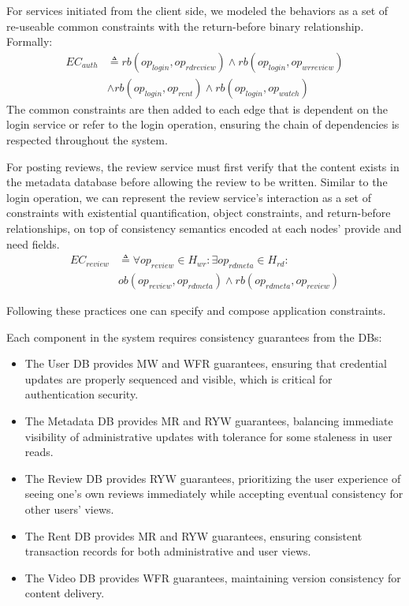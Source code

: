 For services initiated from the client side, we modeled the behaviors
as a set of re-useable common constraints with the return-before
binary relationship. Formally:
\begin{align*}
EC_{auth} &\triangleq rb(op_{login}, op_{rdreview}) \land
rb(op_{login}, op_{wrreview}) \\
&\land rb(op_{login}, op_{rent}) \land rb(op_{login}, op_{watch})
\end{align*}
The common constraints are then added to each edge that is dependent on the
login service or refer to the login operation, ensuring the chain
of dependencies is respected throughout the system.

For posting reviews,
the review service must first verify that the content exists in the
metadata database before allowing the review to be written. Similar to
the login operation, we can represent the review service's interaction
as a set of constraints with existential quantification, object constraints,
and return-before relationships, on top of consistency semantics
encoded at each nodes' provide and need fields.
\begin{align*}
EC_{review} &\triangleq \forall op_{review} \in H_{wr} : \exists
op_{rdmeta} \in H_{rd} :\\
&ob(op_{review}, op_{rdmeta}) \land rb(op_{rdmeta}, op_{review})
\end{align*}

Following these practices one can specify and compose application constraints.

Each component in the system requires consistency guarantees
from the DBs:%
\begin{itemize}
\item The User DB provides MW and WFR guarantees, ensuring
  that credential updates are properly sequenced and visible, which
  is critical for authentication security.
\item The Metadata DB provides MR and RYW guarantees,
  balancing immediate visibility of administrative updates with
  tolerance for some staleness in user reads.
\item The Review DB provides RYW guarantees, prioritizing the
  user experience of seeing one's own reviews immediately while
  accepting eventual consistency for other users' views.
\item The Rent DB provides MR and RYW guarantees, ensuring
  consistent transaction records for both administrative and user views.
\item The Video DB provides WFR guarantees, maintaining
  version consistency for content delivery.
\end{itemize}

